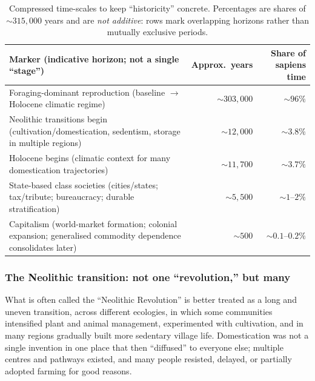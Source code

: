 \begin{table}[htbp]
\centering
\small
\setlength{\tabcolsep}{4pt} %
\renewcommand{\arraystretch}{1.15} %
\begin{tabularx}{\linewidth}{@{}Xrr@{}}
\toprule
\textbf{Marker (indicative horizon; not a single ``stage'')} &
\textbf{Approx.\ years} &
\textbf{Share of sapiens time} \\
\midrule
Foraging-dominant reproduction (baseline \(\rightarrow\) Holocene climatic regime) &
\(\sim 303{,}000\) &
\(\sim 96\%\) \\
Neolithic transitions begin (cultivation/domestication, sedentism, storage in multiple regions) &
\(\sim 12{,}000\) &
\(\sim 3.8\%\) \\
Holocene begins (climatic context for many domestication trajectories) &
\(\sim 11{,}700\) &
\(\sim 3.7\%\) \\
State-based class societies (cities/states; tax/tribute; bureaucracy; durable stratification) &
\(\sim 5{,}500\) &
\(\sim 1\)–\(2\%\) \\
Capitalism (world-market formation; colonial expansion; generalised commodity dependence consolidates later) &
\(\sim 500\) &
\(\sim 0.1\)–\(0.2\%\) \\
\bottomrule
\end{tabularx}
\caption{Compressed time-scales to keep ``historicity'' concrete. Percentages are shares of \(\sim 315{,}000\) years and are \emph{not additive}:
rows mark overlapping horizons rather than mutually exclusive periods.\cite{Hublin2017,Richter2017,Walker2018Holocene,LeeDaly1999,Zeder2011,Scott2017,WoodOriginCapitalism}}
\end{table}


\subsubsection{The Neolithic transition: not one ``revolution,'' but many}
\label{sec:neolithic-transition}

What is often called the ``Neolithic Revolution'' is better treated as a long and uneven transition, across
different ecologies, in which some communities intensified plant and animal management, experimented with
cultivation, and in many regions gradually built more sedentary village life.\cite{Zeder2011,Fuller2023}
Domestication was not a single invention in one place that then ``diffused'' to everyone else; multiple centres
and pathways existed, and many people resisted, delayed, or partially adopted farming for good reasons.\cite{Scott2017}

